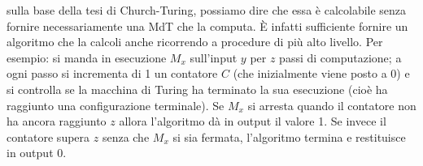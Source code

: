 sulla base della tesi di Church-Turing, possiamo dire che essa è calcolabile senza
fornire necessariamente una MdT che la computa. È infatti sufficiente fornire un
algoritmo che la calcoli anche ricorrendo a procedure di più alto livello. Per
esempio: si manda in esecuzione $M_x$ sull'input $y$ per $z$ passi di computazione;
a ogni passo si incrementa di 1 un contatore $C$ (che inizialmente viene posto a
0) e si controlla se la macchina di Turing ha terminato la sua esecuzione (cioè
ha raggiunto una configurazione terminale). Se $M_x$ si arresta quando il contatore
non ha ancora raggiunto $z$ allora l'algoritmo dà in output il valore 1. Se invece
il contatore supera $z$ senza che $M_x$ si sia fermata, l'algoritmo termina e
restituisce in output 0.